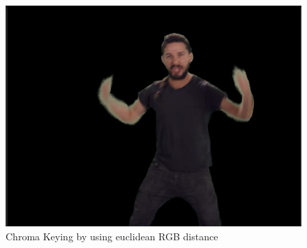 \begin{figure}[htb]
	\includegraphics[width=\textwidth]{_raw_resources/Comparison_DeltaE_color.png}
	\caption{Chroma Keying by using euclidean RGB distance}
	\label{fig:chroma:euclidean:rgb}
\end{figure}
